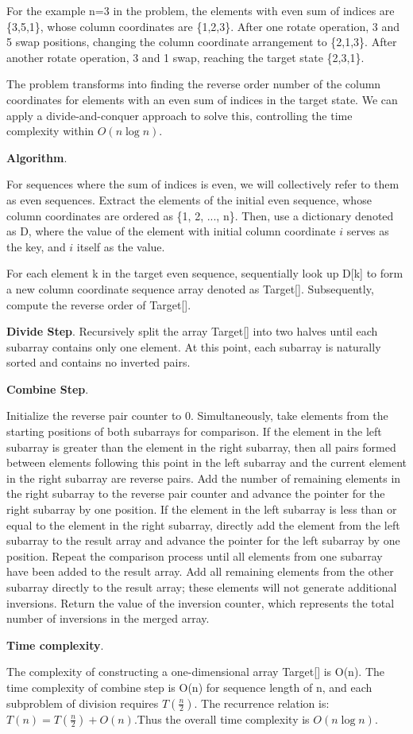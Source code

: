  For the example n=3 in the problem,
 the elements with even sum of indices are \{3,5,1\},
 whose column coordinates are \{1,2,3\}.
 After one rotate operation, 3 and 5 swap positions,
  changing the column coordinate arrangement to \{2,1,3\}.
 After another rotate operation, 3 and 1 swap,
  reaching the target state \{2,3,1\}.

The problem transforms into finding the reverse order
 number of the column coordinates for elements with an even 
 sum of indices in the target state. We can apply a divide-and-conquer 
 approach to solve this, controlling the time complexity within $O(n \log n)$.

\noindent \textbf{Algorithm}.

For sequences where the sum of indices is even, we will collectively refer to them as even sequences.
Extract the elements of the initial even sequence, whose column coordinates are ordered as \{1, 2, ..., n\}.
Then, use a dictionary denoted as D, where the value of the element with initial column coordinate $i$ serves 
as the key, and $i$ itself as the value.

For each element k in the target even sequence, 
sequentially look up D[k] to form a new column coordinate 
sequence array denoted as Target[]. Subsequently, compute the 
reverse order of Target[].

\textbf{Divide Step}.
Recursively split the array Target[] into two halves until each subarray contains only one element. At this point, each subarray is naturally sorted and contains no inverted pairs.


\textbf{Combine Step}.

Initialize the reverse pair counter to 0. Simultaneously, take elements from the starting positions of both subarrays for comparison. If the element in the left subarray is greater than the element in the right subarray, then all pairs formed between elements following this point in the left subarray and the current element in the right subarray are reverse pairs.
Add the number of remaining elements in the right subarray to the reverse pair counter and advance the pointer for the right subarray by one position. If the element in the left subarray is less than or equal to the element in the right subarray, directly add the element from the left subarray to the result array and advance the pointer for the left subarray by one position.
Repeat the comparison process until all elements from one subarray have been added to the result array. Add all remaining elements from the other subarray directly to the result array; these elements will not generate additional inversions. Return the value of the inversion counter, which represents the total number of inversions in the merged array.

\textbf{Time complexity}.

The complexity of constructing a one-dimensional array Target[] is O(n).
The time complexity of combine step is O(n) for sequence length of n, and each subproblem of division requires $T(\frac{n}{2})$.
The recurrence relation is: $T(n)= T(\frac{n}{2}) + O(n)$.Thus the overall time complexity is $O(n \log n)$.
\newpage